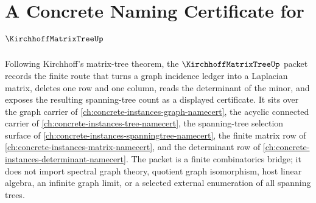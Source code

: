 \chapter{A Concrete Naming Certificate for $\KirchhoffMatrixTreeUp$}
\label{ch:concrete-instances-kirchhoff-matrix-tree-namecert}

Following Kirchhoff's matrix-tree theorem, the $\KirchhoffMatrixTreeUp$ packet records the finite route that turns a graph incidence ledger into a Laplacian matrix, deletes one row and one column, reads the determinant of the minor, and exposes the resulting spanning-tree count as a displayed certificate. It sits over the graph carrier of \autoref{ch:concrete-instances-graph-namecert}, the acyclic connected carrier of \autoref{ch:concrete-instances-tree-namecert}, the spanning-tree selection surface of \autoref{ch:concrete-instances-spanningtree-namecert}, the finite matrix row of \autoref{ch:concrete-instances-matrix-namecert}, and the determinant row of \autoref{ch:concrete-instances-determinant-namecert}. The packet is a finite combinatorics bridge; it does not import spectral graph theory, quotient graph isomorphism, host linear algebra, an infinite graph limit, or a selected external enumeration of all spanning trees.

